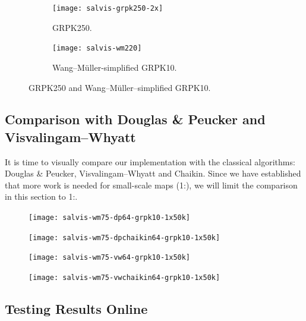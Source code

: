\documentclass[a4paper]{article}
\newcommand{\DP}{Douglas \& Peucker}
\newcommand{\VW}{Visvalingam--Whyatt}
\newcommand{\WM}{Wang--M{\"u}ller}
\begin{document}
\begin{figure}[h!]
    \centering
    \begin{subfigure}[b]{.49\textwidth}
        \texttt{[image: salvis-grpk250-2x]}
        \caption{GRPK250.}
    \end{subfigure}
    \hfill
    \begin{subfigure}[b]{.49\textwidth}
        \centering
        \texttt{[image: salvis-wm220]}
        \caption{{\WM}-simplified GRPK10.}
    \end{subfigure}
    \caption{GRPK250 and {\WM}--simplified GRPK10.}
    \label{fig:salvis-wm220}
\end{figure}

\subsection{Comparison with {\DP} and {\VW}}

It is time to visually compare our implementation with the classical
algorithms: {\DP}, {\VW} and Chaikin. Since we have established that more work is
needed for small-scale maps (1:), we will limit the comparison
in this section to 1:.

\begin{figure}[h!]
    \texttt{[image: salvis-wm75-dp64-grpk10-1x50k]}
    \caption{}
    \label{fig:salvis-wm75-dp64-grpk10-1x50k}
\end{figure}

\begin{figure}[h!]
    \texttt{[image: salvis-wm75-dpchaikin64-grpk10-1x50k]}
    \caption{}
    \label{fig:salvis-wm75-dpchaikin64-grpk10-1x50k}
\end{figure}

\clearpage

\begin{figure}[h!]
    \texttt{[image: salvis-wm75-vw64-grpk10-1x50k]}
    \caption{}
    \label{fig:salvis-wm75-vw64-grpk10-1x50k}
\end{figure}

\begin{figure}[h!]
    \texttt{[image: salvis-wm75-vwchaikin64-grpk10-1x50k]}
    \caption{}
    \label{fig:salvis-wm75-vwchaikin64-grpk10-1x50k}
\end{figure}

\clearpage

\subsection{Testing Results Online}
\label{sec:testing-results-online}
\end{document}
